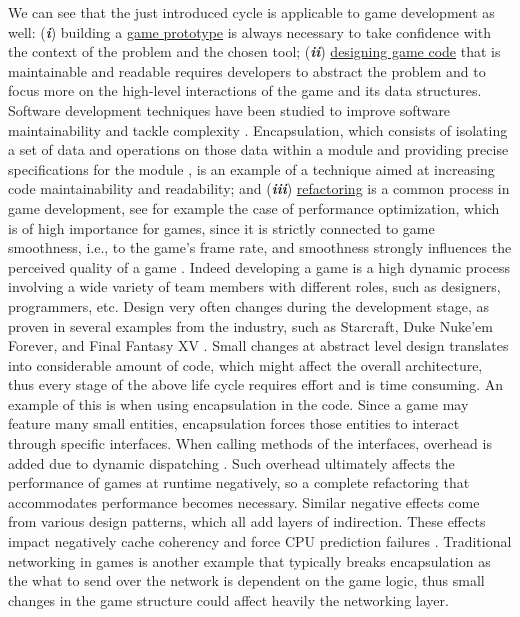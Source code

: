 We can see that the just introduced cycle is applicable to game development as well: (\textit{\textbf{i}}) building a \underline{game prototype} is always necessary to take confidence with the context of the problem and the chosen tool; (\textit{\textbf{ii}}) \underline{designing game code} that is maintainable and readable requires developers to abstract the problem and to focus more on the high-level interactions of the game and its data structures. Software development techniques have been studied to improve software maintainability and tackle complexity \cite{collar2006role}. Encapsulation, which consists of isolating a set of data and operations on those data within a module and providing precise specifications for the module \cite{citeulike:10949855}, is an example of a technique aimed at increasing code maintainability and readability; and (\textit{\textbf{iii}}) \underline{refactoring} is a common process in game development, see for example the case of performance optimization, which is of high importance for games, since it is strictly connected to game smoothness, i.e., to the game's frame rate, and smoothness strongly influences the perceived quality of a game \cite{claypool2009perspectives}. Indeed developing a game is a high dynamic process \cite{takeuchi1986new} involving a wide variety of team members with different roles, such as designers, programmers, etc. Design very often changes during the development stage, as proven in several examples from the industry, such as Starcraft, Duke Nuke'em Forever, and Final Fantasy XV \cite{variety_article}. Small changes at abstract level design translates into considerable amount of code, which might affect the overall architecture, thus every stage of the above life cycle requires effort and is time consuming. An example of this is when using encapsulation \cite{zhou2008partial} in the code. Since a game may feature many small entities, encapsulation forces those entities to interact through specific interfaces. When calling methods of the interfaces, overhead is added due to dynamic dispatching \cite{zhou2008partial}. Such overhead ultimately affects the performance of games at runtime negatively, so a complete refactoring that accommodates performance becomes necessary. Similar negative effects come from various design patterns, which all add layers of indirection. These effects impact negatively cache coherency and force CPU prediction failures \cite{albrecht2009pitfalls}. Traditional networking in games is another example that typically breaks encapsulation as the what to send over the network is dependent on the game logic, thus small changes in the game structure could affect heavily the networking layer.


